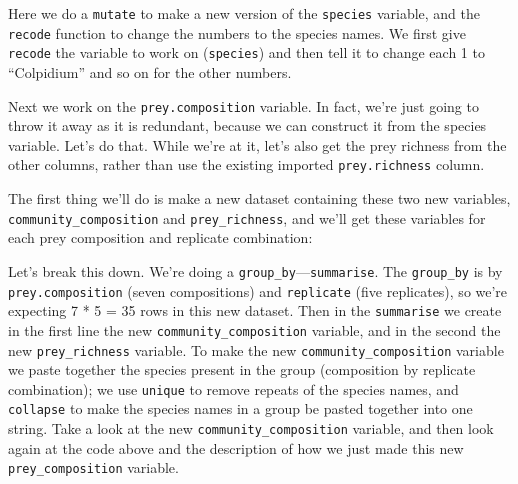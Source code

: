 \documentclass[]{book}
\newenvironment{Shaded}{\begin{snugshade}}{\end{snugshade}}
\newcommand{\DataTypeTok}[1]{\textcolor[rgb]{0.13,0.29,0.53}{#1}}
\newcommand{\DecValTok}[1]{\textcolor[rgb]{0.00,0.00,0.81}{#1}}
\newcommand{\KeywordTok}[1]{\textcolor[rgb]{0.13,0.29,0.53}{\textbf{#1}}}
\newcommand{\NormalTok}[1]{#1}
\newcommand{\OperatorTok}[1]{\textcolor[rgb]{0.81,0.36,0.00}{\textbf{#1}}}
\newcommand{\StringTok}[1]{\textcolor[rgb]{0.31,0.60,0.02}{#1}}
\begin{document}
Here we do a \texttt{mutate} to make a new version of the \texttt{species} variable, and the \texttt{recode} function to change the numbers to the species names. We first give \texttt{recode} the variable to work on (\texttt{species}) and then tell it to change each 1 to ``Colpidium'' and so on for the other numbers.

Next we work on the \texttt{prey.composition} variable. In fact, we're just going to throw it away as it is redundant, because we can construct it from the species variable. Let's do that. While we're at it, let's also get the prey richness from the other columns, rather than use the existing imported \texttt{prey.richness} column.

The first thing we'll do is make a new dataset containing these two new variables, \texttt{community\_composition} and \texttt{prey\_richness}, and we'll get these variables for each prey composition and replicate combination:

\begin{Shaded}
\end{Shaded}

Let's break this down. We're doing a \texttt{group\_by}---\texttt{summarise}. The \texttt{group\_by} is by \texttt{prey.composition} (seven compositions) and \texttt{replicate} (five replicates), so we're expecting 7 * 5 = 35 rows in this new dataset. Then in the \texttt{summarise} we create in the first line the new \texttt{community\_composition} variable, and in the second the new \texttt{prey\_richness} variable. To make the new \texttt{community\_composition} variable we paste together the species present in the group (composition by replicate combination); we use \texttt{unique} to remove repeats of the species names, and \texttt{collapse} to make the species names in a group be pasted together into one string. Take a look at the new \texttt{community\_composition} variable, and then look again at the code above and the description of how we just made this new \texttt{prey\_composition} variable.
\end{document}

